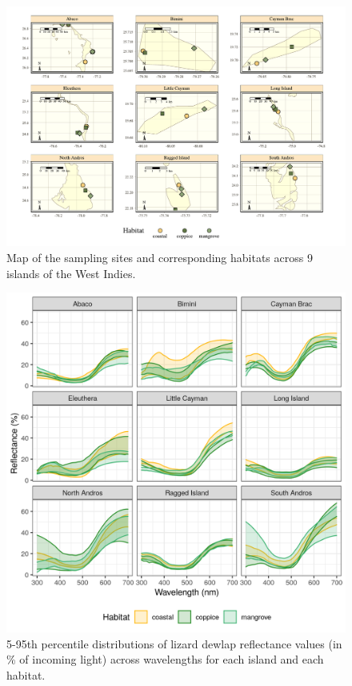 \begin{figure}[H]
\centering
	\includegraphics[width=\textwidth]{../maps/detailed_map.pdf}
	\caption{Map of the sampling sites and corresponding habitats across 9 islands of the West Indies.}
	\label{supfig:map}
\end{figure}

\begin{figure}[H]
    \centering
	\includegraphics[width=\textwidth]{../analyses/02-reflectance/figure_reflectance.png}
	\caption{5-95th percentile distributions of lizard dewlap reflectance values (in \% of incoming light) across wavelengths for each island and each habitat.}
	\label{supfig:reflectance}
\end{figure}

